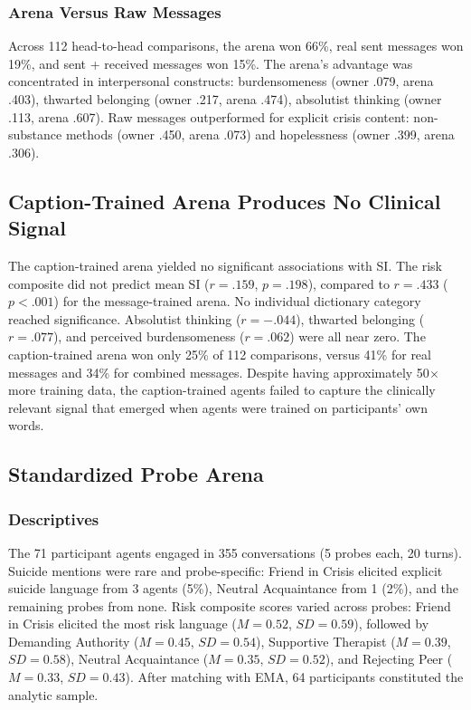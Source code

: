 \documentclass[review,12pt,authoryear]{elsarticle}
\begin{document}
\subsubsection{Arena Versus Raw Messages}

Across 112 head-to-head comparisons, the arena won 66\%, real sent messages won 19\%, and sent + received messages won 15\%. The arena's advantage was concentrated in interpersonal constructs: burdensomeness (owner .079, arena .403), thwarted belonging (owner .217, arena .474), absolutist thinking (owner .113, arena .607). Raw messages outperformed for explicit crisis content: non-substance methods (owner .450, arena .073) and hopelessness (owner .399, arena .306).

\subsection{Caption-Trained Arena Produces No Clinical Signal}

The caption-trained arena yielded no significant associations with SI. The risk composite did not predict mean SI ($r = .159$, $p = .198$), compared to $r = .433$ ($p < .001$) for the message-trained arena. No individual dictionary category reached significance. Absolutist thinking ($r = -.044$), thwarted belonging ($r = .077$), and perceived burdensomeness ($r = .062$) were all near zero. The caption-trained arena won only 25\% of 112 comparisons, versus 41\% for real messages and 34\% for combined messages. Despite having approximately 50$\times$ more training data, the caption-trained agents failed to capture the clinically relevant signal that emerged when agents were trained on participants' own words.

\subsection{Standardized Probe Arena}

\subsubsection{Descriptives}

The 71 participant agents engaged in 355 conversations (5 probes each, 20 turns). Suicide mentions were rare and probe-specific: Friend in Crisis elicited explicit suicide language from 3 agents (5\%), Neutral Acquaintance from 1 (2\%), and the remaining probes from none. Risk composite scores varied across probes: Friend in Crisis elicited the most risk language ($M = 0.52$, $SD = 0.59$), followed by Demanding Authority ($M = 0.45$, $SD = 0.54$), Supportive Therapist ($M = 0.39$, $SD = 0.58$), Neutral Acquaintance ($M = 0.35$, $SD = 0.52$), and Rejecting Peer ($M = 0.33$, $SD = 0.43$). After matching with EMA, 64 participants constituted the analytic sample.
\end{document}
